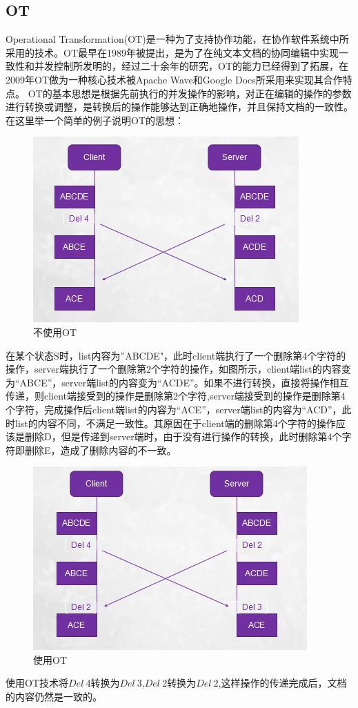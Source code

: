 \subsection{OT}
Operational Transformation(OT)是一种为了支持协作功能，在协作软件系统中所采用的技术。OT最早在1989年被提出，是为了在纯文本文档的协同编辑中实现一致性和并发控制所发明的，经过二十余年的研究，OT的能力已经得到了拓展，在2009年OT做为一种核心技术被Apache Wave和Google Docs所采用来实现其合作特点。
OT的基本思想是根据先前执行的并发操作的影响，对正在编辑的操作的参数进行转换或调整，是转换后的操作能够达到正确地操作，并且保持文档的一致性。
在这里举一个简单的例子说明OT的思想：
\begin{figure}[H]
\centering
\includegraphics{figures/exm1.bmp}
\caption{不使用OT}
\end{figure}
在某个状态S时，list内容为”ABCDE"，此时client端执行了一个删除第4个字符的操作，server端执行了一个删除第2个字符的操作，如图所示，client端list的内容变为“ABCE”，server端list的内容变为“ACDE”。如果不进行转换，直接将操作相互传递，则client端接受到的操作是删除第2个字符,server端接受到的操作是删除第4个字符，完成操作后client端list的内容为“ACE”，server端list的内容为“ACD”，此时list的内容不同，不满足一致性。其原因在于client端的删除第4个字符的操作应该是删除D，但是传递到server端时，由于没有进行操作的转换，此时删除第4个字符即删除E，造成了删除内容的不一致。
\begin{figure}[H]
\centering
\includegraphics{figures/exm2.bmp}
\caption{使用OT}
\end{figure}
使用OT技术将$Del\ 4$转换为$Del\ 3$,$Del\ 2$转换为$Del\ 2$,这样操作的传递完成后，文档的内容仍然是一致的。

